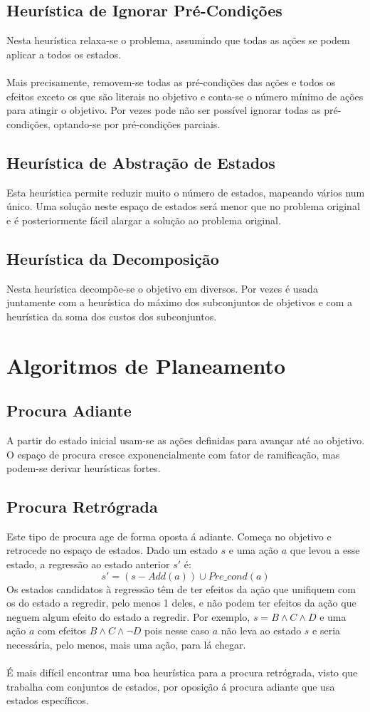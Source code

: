 \documentclass[10pt,a4paper]{report}
\begin{document}
\subsection{Heurística de Ignorar Pré-Condições}
Nesta heurística relaxa-se o problema, assumindo que todas as ações se podem aplicar a todos os estados.\\
\\
Mais precisamente, removem-se todas as pré-condições das ações e todos os efeitos exceto os que são literais no objetivo e conta-se o número mínimo de ações para atingir o objetivo. Por vezes pode não ser possível ignorar todas as pré-condições, optando-se por pré-condições parciais.
\subsection{Heurística de Abstração de Estados}
Esta heurística permite reduzir muito o número de estados, mapeando vários num único. Uma solução neste espaço de estados será menor que no problema original e é posteriormente fácil alargar a solução ao problema original.
\subsection{Heurística da Decomposição}
Nesta heurística decompõe-se o objetivo em diversos. Por vezes é usada juntamente com a heurística do máximo dos subconjuntos de objetivos e com a heurística da soma dos custos dos subconjuntos. 
\section{Algoritmos de Planeamento}
\subsection{Procura Adiante}
A partir do estado inicial usam-se as ações definidas para avançar até ao objetivo. O espaço de procura cresce exponencialmente com fator de ramificação, mas podem-se derivar heurísticas fortes.
\subsection{Procura Retrógrada}
Este tipo de procura age de forma oposta á adiante. Começa no objetivo e retrocede no espaço de estados. Dado um estado $s$ e uma ação $a$ que levou a esse estado, a regressão ao estado anterior $s'$ é:
$$
s' = (s - Add(a)) \cup Pre\_cond(a)
$$
Os estados candidatos à regressão têm de ter efeitos da ação que unifiquem com os do estado a regredir, pelo menos 1 deles, e não podem ter efeitos da ação que neguem algum efeito do estado a regredir. Por exemplo, $s = B \land C \land D$ e uma ação $a$ com efeitos $B \land C \land \lnot D$ pois nesse caso $a$ não leva ao estado $s$ e seria necessária, pelo menos, mais uma ação, para lá chegar.\\
\\
É mais difícil encontrar uma boa heurística para a procura retrógrada, visto que trabalha com conjuntos de estados, por oposição á procura adiante que usa estados específicos.
\end{document}
